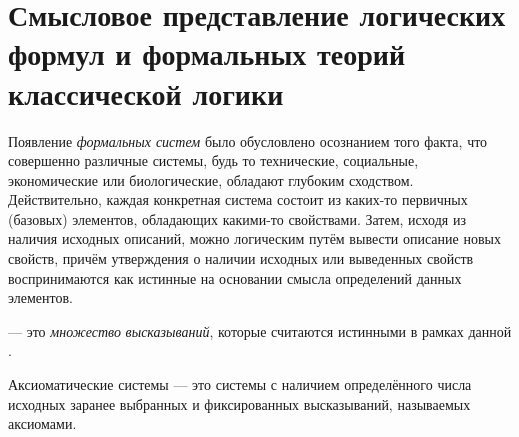 
\section{Смысловое представление логических формул и формальных теорий классической логики}
\label{sec_class_logic}
Появление \textit{формальных систем} было обусловлено осознанием того факта, что совершенно различные системы, будь то технические, социальные, экономические или биологические, обладают глубоким сходством. Действительно, каждая конкретная система состоит из каких-то первичных (базовых) элементов, обладающих какими-то свойствами. Затем, исходя из наличия исходных описаний, можно логическим путём вывести описание новых свойств, причём утверждения о наличии исходных или выведенных свойств воспринимаются как истинные на основании смысла определений данных элементов.

 --- это \textit{множество} \textit{высказываний}, которые считаются истинными в рамках данной .

Аксиоматические системы --- это системы с наличием определённого числа исходных заранее выбранных и фиксированных высказываний, называемых аксиомами.

